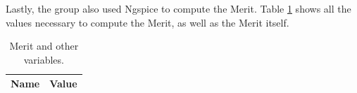 Lastly, the group also used Ngspice to compute the Merit. Table \ref{tab:merit} shows all the 
values necessary to compute the Merit, as well as the Merit itself.

\begin{table}[ht]
	\centering
	\begin{tabular}{|l|r|}
		\hline    
		{\bf Name} & {\bf Value} \\ \hline
    		
	\end{tabular}
	
	\caption{Merit and other variables.}
    
\label{tab:merit}
\end{table}

